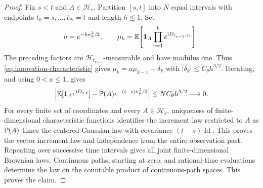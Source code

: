 \begin{proof}
Fix $s<t$ and $A\in\mathcal H_s$. Partition $[s,t]$ into $N$ equal intervals
with endpoints $t_0=s,\ldots,t_N=t$ and length $h\le1$. Set
\[
 a=e^{-h\sigma_\theta^2/2},\qquad
 \mu_k=\E\!\left[\1_A
        \prod_{r=1}^k e^{\mathrm iD_{t_{r-1},t_r}}\right].
\]
The preceding factors are $\mathcal H_{t_{k-1}}$-measurable and have modulus
one. Thus \eqref{eq:innovation-characteristic} gives
$\mu_k=a\mu_{k-1}+\delta_k$ with
$|\delta_k|\le C_\theta h^{3/2}$. Iterating, and using $0<a\le1$, gives
\[
 \left|\E[\1_Ae^{\mathrm iD_{s,t}}]
       -\P(A)e^{-(t-s)\sigma_\theta^2/2}\right|
 \le NC_\theta h^{3/2}\longrightarrow0.
\]
For every finite set of coordinates and every $A\in\mathcal H_s$, uniqueness
of finite-dimensional characteristic functions identifies the increment law
restricted to $A$ as $\P(A)$ times the centered Gaussian law with covariance
$(t-s)\operatorname{Id}$. This proves the vector increment law and independence
from the entire observation past. Repeating over successive time intervals
gives all joint finite-dimensional Brownian laws. Continuous paths, starting
at zero, and rational-time evaluations determine the law on the countable
product of continuous-path spaces. This proves the claim.
\end{proof}
